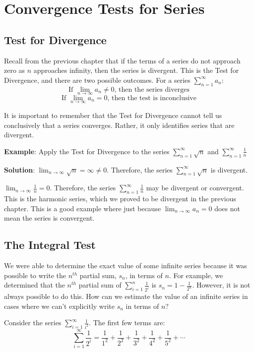 \chapter{Convergence Tests for Series}

\section{Test for Divergence}
Recall from the previous chapter that if the terms of a series do not approach zero as $n$ approaches infinity, then the series is divergent. This is the Test for Divergence, and there are two possible outcomes. For a series $\sum_{n = 1}^\infty a_n$:
$$\text{If } \lim_{n \to \infty} a_n \neq 0 \text{, then the series diverges}$$
$$\text{If } \lim_{n \to \infty} a_n = 0 \text{, then the test is inconclusive}$$

It is important to remember that the Test for Divergence cannot tell us conclusively that a series converges. Rather, it only identifies series that are divergent. 

\textbf{Example}: Apply the Test for Divergence to the series $\sum_{n=1}^\infty \sqrt{n}$ and $\sum_{n=1}^\infty \frac{1}{n}$

\textbf{Solution}: $\lim_{n \to \infty} \sqrt{n} = \infty \neq 0$. Therefore, the series $\sum_{n=1}^\infty \sqrt{n}$ is divergent. 

$\lim_{n \to \infty} \frac{1}{n} = 0$. Therefore, the series $\sum_{n=1}^\infty \frac{1}{n}$ may be divergent or convergent. This is the harmonic series, which we proved to be divergent in the previous chapter. This is a good example where just because $\lim_{n \to \infty} a_n = 0$ does not mean the series is convergent. 

\section{The Integral Test}
We were able to determine the exact value of some infinite series because it 
was possible to write the $n^{th}$ partial sum, $s_n$, in terms of $n$. For 
example, we determined that the $n^{th}$ partial sum of $\sum_{i = 1}^n 
\frac{1}{2^i}$ is $s_n = 1 - \frac{1}{2^n}$. However, it is not always possible 
to do this. How can we estimate the value of an infinite series in cases where 
we can't explicitly write $s_n$ in terms of $n$?

Consider the series $\sum_{i = 1}^\infty \frac{1}{i^2}$. The first few terms 
are:
$$\sum_{i = 1}^\infty \frac{1}{2^i} = \frac{1}{1^2} + \frac{1}{2^2} + 
\frac{1}{3^2} + \frac{1}{4^2} + \frac{1}{5^2} + \cdots$$

